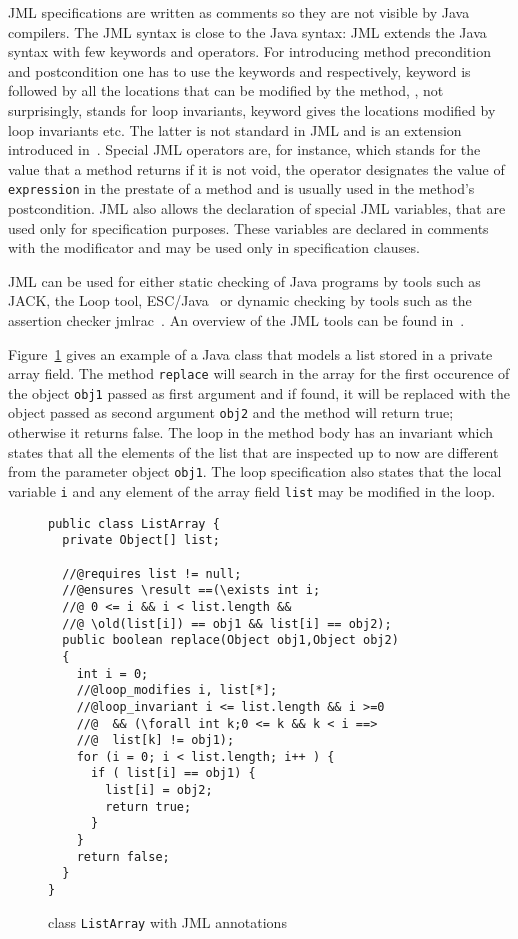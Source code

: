 JML specifications are written as comments so they are not visible by Java compilers. The JML syntax is close to the 
 Java syntax: JML extends the Java  syntax with few keywords and operators.
 For introducing method precondition and postcondition one has to use the keywords  and  
  respectively,   keyword is followed by all the locations that can be modified by the method, 
  , not surprisingly, stands for loop invariants,  keyword gives the locations modified by loop invariants etc. 
  The latter is not standard in JML and is an extension introduced in~\cite{BRL-JACK}. Special JML operators are, for instance,  which stands for the value that a method returns if it is not void, the  operator 
  designates the value of \texttt{expression} in the prestate of a method and is usually used in the method's postcondition. 
  JML also allows the declaration of special JML variables, that are used only for specification purposes. 
These variables are declared in comments with the  modificator and may be used only in specification clauses. 

JML can be used for either static checking of Java programs by tools such as JACK, the Loop tool, 
ESC/Java~\cite{escjava} or dynamic checking by tools such as the assertion checker jmlrac~\cite{jmlrac}. An overview of the JML tools can 
be found in~\cite{BurdyCCEKLLP03}.
     
Figure~\ref{replaceSrc} gives an example of a Java class that models a list stored in a private array field. 
The method \texttt{replace} will search in the array for the first occurence of the object \texttt{obj1} passed as first argument and if found, it will be replaced with the object passed as second argument \texttt{obj2} and the method will return true; otherwise it returns false. The loop in the method body has an invariant which states that all the elements of the list that are inspected up to now are different from the parameter object \texttt{obj1}. The loop specification also states
that the local variable \texttt{i} and any element of the array field \texttt{list} may be modified in the loop.

\begin{figure}[ht!]
\begin{verbatim}
public class ListArray {
  private Object[] list;

  //@requires list != null;
  //@ensures \result ==(\exists int i; 
  //@ 0 <= i && i < list.length && 
  //@ \old(list[i]) == obj1 && list[i] == obj2); 
  public boolean replace(Object obj1,Object obj2)
  {
    int i = 0;
    //@loop_modifies i, list[*];
    //@loop_invariant i <= list.length && i >=0 
    //@  && (\forall int k;0 <= k && k < i ==> 
    //@  list[k] != obj1); 
    for (i = 0; i < list.length; i++ ) {
      if ( list[i] == obj1) {
        list[i] = obj2;
        return true;	
      }
    }
    return false;
  }
}
\end{verbatim}
\caption{\sc class \mbox{\rm\texttt{ListArray}} with JML annotations} 
\label{replaceSrc}
\end{figure}


